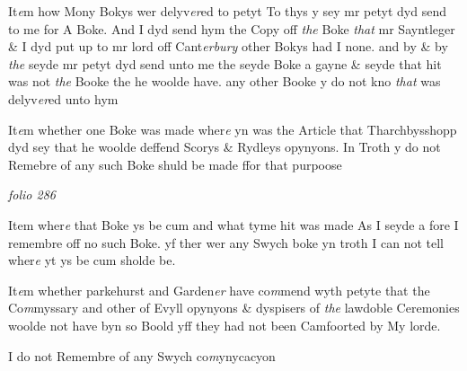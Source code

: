 \documentclass[12pt, a4paper]{book}
\begin{document}
		\ifthenelse{\isodd{\thepage}}
		{\reversemarginpar}
		{\normalmarginpar}
		 It\textit{e}m how Mony Bokys wer delyv\textit{er}ed to petyt
To thys y sey mr petyt dyd send to me for A Boke. And I dyd send hym
the Copy off \textit{the} Boke \textit{that} mr Sayntleger \& I dyd put up to mr lord off
Cant\textit{erbury} other Bokys had I none. and by \& by \textit{the} seyde mr petyt dyd send
unto me the seyde Boke a gayne \& seyde that hit was not \textit{the} Booke the 
he woolde have. any other Booke y do not kno \textit{that} was delyv\textit{er}ed unto hym

 	
 	
				\marginpar[\vspace{0.5cm}{\textcolor{Gray}{21}}]{}
			

		\ifthenelse{\isodd{\thepage}}
		{\reversemarginpar}
		{\normalmarginpar}
		 It\textit{e}m whether one Boke was made wher\textit{e} yn was the Article that
Tharchbysshopp dyd sey that he woolde deffend Scorys \& Rydleys
opynyons. 
In Troth y do not Remebre of any such Boke shuld be made
ffor that purpoose

\dotfill
						\newpage
{}

\textit{folio 286}


 	
 	

				\marginpar[\vspace{0.5cm}{\textcolor{Gray}{23}}]{}
			
		\ifthenelse{\isodd{\thepage}}
		{\reversemarginpar}
		{\normalmarginpar}
		 Item wher\textit{e} that Boke ys be cum and what tyme hit was made
As I seyde a fore I remembre off no such Boke. yf ther wer any Swych boke
yn troth I can not tell wher\textit{e} yt ys be cum
			 sholde be. 
 	
 	
 	
				\marginpar[\vspace{0.5cm}{\textcolor{Gray}{23}}]{}
			 
		\ifthenelse{\isodd{\thepage}}
		{\reversemarginpar}
		{\normalmarginpar}
		It\textit{e}m whether parkehurst and Garden\textit{er} have co\textit{m}mend wyth petyte that
the Co\textit{m}myssary and other of Evyll opynyons \& dyspisers of \textit{the} lawdoble
Ceremonies woolde not have byn so Boold yff they had not been
Camfoorted by My lorde. 


		\ifthenelse{\isodd{\thepage}}
		{\reversemarginpar}
		{\normalmarginpar}
		I do not Remembre of any Swych co\textit{m}ynycacyon
\end{document}
